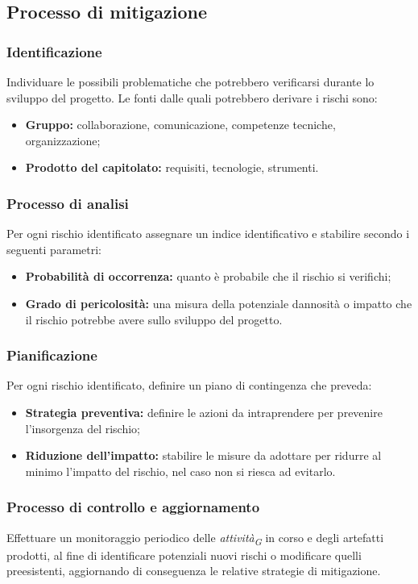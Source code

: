 \subsection{Processo di mitigazione}
\subsubsection{Identificazione}
    Individuare le possibili problematiche che potrebbero verificarsi durante lo sviluppo del progetto. 
    Le fonti dalle quali potrebbero derivare i rischi sono: 
    \begin{itemize}
        \item \textbf{Gruppo:} collaborazione, comunicazione, competenze tecniche, organizzazione;
        \item \textbf{Prodotto del capitolato:} requisiti, tecnologie, strumenti.
    \end{itemize}

\subsubsection{Processo di analisi}
Per ogni rischio identificato assegnare un indice identificativo e stabilire secondo i seguenti parametri:
\begin{itemize}
    \item \textbf{Probabilità di occorrenza:} quanto è probabile che il rischio si verifichi;
    \item \textbf{Grado di pericolosità:} una misura della potenziale dannosità o impatto che il rischio potrebbe avere sullo sviluppo del progetto.
\end{itemize}

\subsubsection{Pianificazione}
Per ogni rischio identificato, definire un piano di contingenza che preveda:
\begin{itemize}
    \item \textbf{Strategia preventiva:} definire le azioni da intraprendere per prevenire l’insorgenza del rischio;
    \item \textbf{Riduzione dell'impatto:} stabilire le misure da adottare per ridurre al minimo l'impatto del rischio, nel caso non si riesca ad evitarlo.
\end{itemize}

\subsubsection{Processo di controllo e aggiornamento}
Effettuare un monitoraggio periodico delle \textit{attività}\textsubscript{\textit{G}} in corso e degli artefatti prodotti, al fine di identificare potenziali nuovi rischi o modificare quelli preesistenti, aggiornando di conseguenza le relative strategie di mitigazione.


